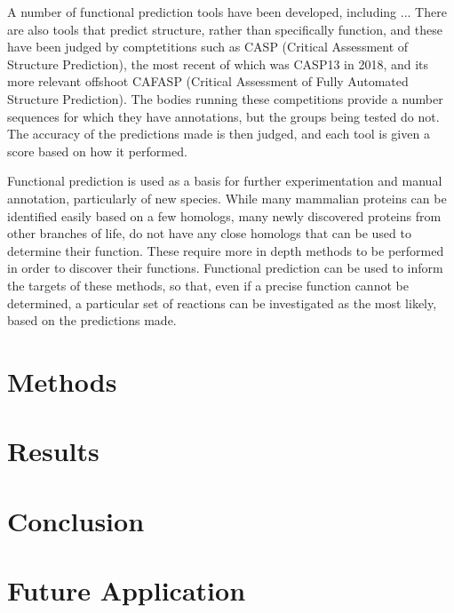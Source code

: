 \documentclass[12pt]{report}
\begin{document}
		
		A number of functional prediction tools have been developed, including ...  There are also tools that predict structure, rather than specifically function, and these have been judged by comptetitions such as CASP (Critical Assessment of Structure Prediction), the most recent of which was CASP13 in 2018, and its more relevant offshoot CAFASP (Critical Assessment of Fully Automated Structure Prediction).  The bodies running these competitions provide a number sequences for which they have annotations, but the groups being tested do not.  The accuracy of the predictions made is then judged, and each tool is given a score based on how it performed.%
		
		Functional prediction is used as a basis for further experimentation and manual annotation, particularly of new species.  While many mammalian proteins can be identified easily based on a few homologs, many newly discovered proteins from other branches of life, do not have any close homologs that can be used to determine their function.  These require more in depth methods to be performed in order to discover their functions.  Functional prediction can be used to inform the targets of these methods, so that, even if a precise function cannot be determined, a particular set of reactions can be investigated as the most likely, based on the predictions made. %
		
	\section{Methods}
		
		
		
	\section{Results}
		
		
				
	\section{Conclusion}
		
		
		
	\section{Future Application}
		
	
	{}
	
\end{document}
